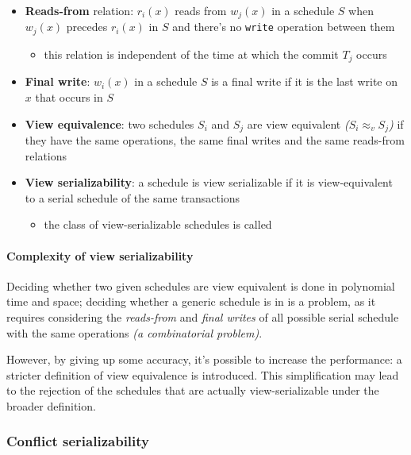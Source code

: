 \documentclass[english]{article}
\begin{document}
\begin{itemize}
  \item \textbf{Reads-from} relation: \(r_i(x)\) reads from \(w_j(x)\) in a schedule \(S\) when \(w_j(x)\) precedes \(r_i(x)\) in \(S\) and there's no \texttt{write} operation between them
        \begin{itemize}
          \item this relation is independent of the time at which the commit \(T_j\) occurs
        \end{itemize}
  \item \textbf{Final write}: \(w_i(x)\) in a schedule \(S\) is a final write if it is the last write on \(x\) that occurs in \(S\)
  \item \textbf{View equivalence}: two schedules \(S_i\) and \(S_j\) are view equivalent \textit{(\(S_i \approx_v S_j\))} if they have the same operations, the same final writes and the same reads-from relations
  \item \textbf{View serializability}: a schedule is view serializable if it is view-equivalent to a serial schedule of the same transactions
        \begin{itemize}
          \item the class of view-serializable schedules is called \VSR
        \end{itemize}
\end{itemize}

\paragraph{Complexity of view serializability}

Deciding whether two given schedules are view equivalent is done in polynomial time and space;
deciding whether a generic schedule is in \VSR is a \NPC problem, as it requires considering the \textit{reads-from} and \textit{final writes} of all possible serial schedule with the same operations \textit{(a combinatorial problem)}.

However, by giving up some accuracy, it's possible to increase the performance: a stricter definition of view equivalence is introduced.
This simplification may lead to the rejection of the schedules that are actually view-serializable under the broader definition.

\subsubsection{Conflict serializability}
\end{document}
